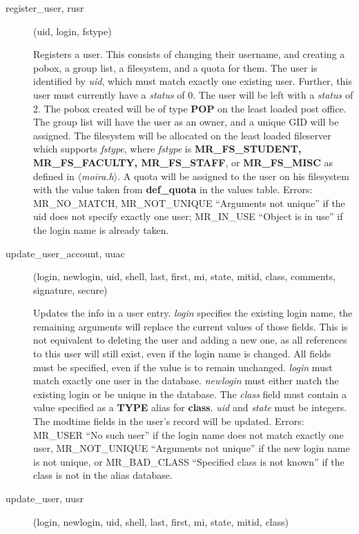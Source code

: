 \begin{description}
\item[register\_user, rusr](uid, login, fstype)

Registers a user. This consists of changing their username, and
creating a pobox, a group list, a filesystem, and a quota for them.
The user is identified by {\em uid}, which must match exactly one
existing user. Further, this user must currently have a {\em status}
of 0. The user will be left with a {\em status} of 2. The pobox
created will be of type {\bf POP} on the least loaded post office. The
group list will have the user as an owner, and a unique GID will be
assigned. The filesystem will be allocated on the least loaded
fileserver which supports {\em fstype}, where {\em fstype} is {\bf
MR\_FS\_STUDENT, MR\_FS\_FACULTY, MR\_FS\_STAFF}, or {\bf MR\_FS\_MISC} as
defined in {\em $\langle$moira.h$\rangle$}. A quota will be assigned
to the user on his filesystem with the value taken from {\bf
def\_quota} in the values table. Errors: MR\_NO\_MATCH, MR\_NOT\_UNIQUE
``Arguments not unique'' if the uid does not specify exactly one user;
MR\_IN\_USE ``Object is in use'' if the login name is already taken.

\item[update\_user\_account, uuac](login, newlogin, uid, shell, last,
first, mi, state, mitid, class, comments, signature, secure)

Updates the info in a user entry.  {\em login} specifies the existing
login name, the remaining arguments will replace the current values
of those fields.  This is not equivalent to deleting the user and
adding a new one, as all references to this user will still exist,
even if the login name is changed.  All fields must be specified, even
if the value is to remain unchanged.  {\em login} must match exactly one
user in the database.  {\em newlogin} must either match the existing
login or be unique in the database.  The {\em class} field must contain
a value specified as a {\bf TYPE} alias for {\bf class}.  {\em uid} and
{\em state} must be integers.  The modtime fields in the user's record
will be updated.  Errors: MR\_USER ``No such user'' if the login name
does not match exactly one user, MR\_NOT\_UNIQUE ``Arguments not unique''
if the new login name is not unique, or MR\_BAD\_CLASS ``Specified class
is not known'' if the class is not in the alias database.

\item[update\_user, uusr](login, newlogin, uid, shell, last, first, mi, state,
mitid, class)


\end{description}
